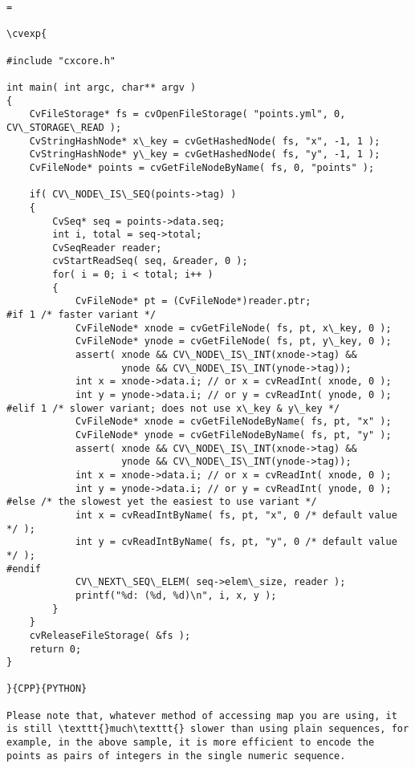 \begin{verbatim}=

\cvexp{

#include "cxcore.h"

int main( int argc, char** argv )
{
    CvFileStorage* fs = cvOpenFileStorage( "points.yml", 0, CV\_STORAGE\_READ );
    CvStringHashNode* x\_key = cvGetHashedNode( fs, "x", -1, 1 );
    CvStringHashNode* y\_key = cvGetHashedNode( fs, "y", -1, 1 );
    CvFileNode* points = cvGetFileNodeByName( fs, 0, "points" );

    if( CV\_NODE\_IS\_SEQ(points->tag) )
    {
        CvSeq* seq = points->data.seq;
        int i, total = seq->total;
        CvSeqReader reader;
        cvStartReadSeq( seq, &reader, 0 );
        for( i = 0; i < total; i++ )
        {
            CvFileNode* pt = (CvFileNode*)reader.ptr;
#if 1 /* faster variant */
            CvFileNode* xnode = cvGetFileNode( fs, pt, x\_key, 0 );
            CvFileNode* ynode = cvGetFileNode( fs, pt, y\_key, 0 );
            assert( xnode && CV\_NODE\_IS\_INT(xnode->tag) &&
                    ynode && CV\_NODE\_IS\_INT(ynode->tag));
            int x = xnode->data.i; // or x = cvReadInt( xnode, 0 );
            int y = ynode->data.i; // or y = cvReadInt( ynode, 0 );
#elif 1 /* slower variant; does not use x\_key & y\_key */
            CvFileNode* xnode = cvGetFileNodeByName( fs, pt, "x" );
            CvFileNode* ynode = cvGetFileNodeByName( fs, pt, "y" );
            assert( xnode && CV\_NODE\_IS\_INT(xnode->tag) &&
                    ynode && CV\_NODE\_IS\_INT(ynode->tag));
            int x = xnode->data.i; // or x = cvReadInt( xnode, 0 );
            int y = ynode->data.i; // or y = cvReadInt( ynode, 0 );
#else /* the slowest yet the easiest to use variant */
            int x = cvReadIntByName( fs, pt, "x", 0 /* default value */ );
            int y = cvReadIntByName( fs, pt, "y", 0 /* default value */ );
#endif
            CV\_NEXT\_SEQ\_ELEM( seq->elem\_size, reader );
            printf("%d: (%d, %d)\n", i, x, y );
        }
    }
    cvReleaseFileStorage( &fs );
    return 0;
}

}{CPP}{PYTHON}

Please note that, whatever method of accessing map you are using, it is still \texttt{}much\texttt{} slower than using plain sequences, for example, in the above sample, it is more efficient to encode the points as pairs of integers in the single numeric sequence.


\end{verbatim}
